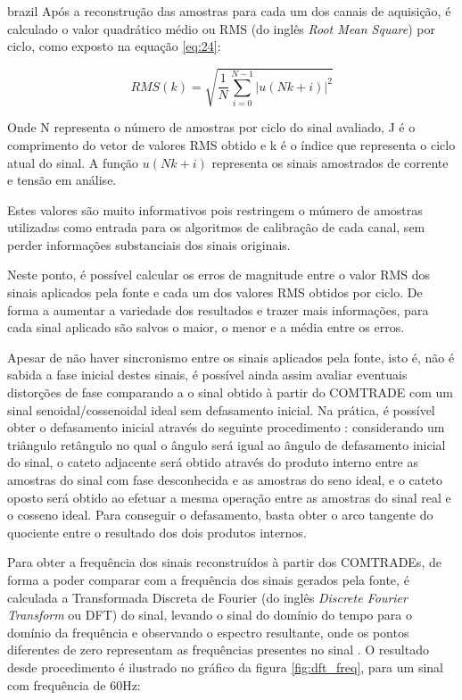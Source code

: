 \begin{otherlanguage*}{brazil}
Após a reconstrução das amostras para cada um dos canais de aquisição, é calculado o valor quadrático médio ou RMS (do inglês \textit{Root Mean Square}) por ciclo, como exposto na equação \ref{eq:24}:

\begin{equation}\label{eq:24}
RMS(k) = \sqrt{\frac{1}{N} \sum_{i=0}^{N - 1} |u(Nk + i)|^2}
\end{equation} 

Onde N representa o número de amostras por ciclo do sinal avaliado, J é o comprimento do vetor de valores  RMS obtido e k é o índice que representa o ciclo atual do sinal. A função $u(Nk + i)$ representa os sinais amostrados de corrente e tensão em análise.

Estes valores são muito informativos pois restringem o múmero de amostras utilizadas como entrada para os algoritmos de calibração de cada canal, sem perder informações substanciais dos sinais originais. 

Neste ponto, é possível calcular os erros de magnitude entre o valor RMS dos sinais aplicados pela fonte e cada um dos valores RMS obtidos por ciclo. De forma a aumentar a variedade dos resultados e trazer mais informações, para cada sinal aplicado são salvos o maior, o menor e a média entre os erros. 

Apesar de não haver sincronismo entre os sinais aplicados pela fonte, isto é, não é sabida a fase inicial destes sinais, é possível ainda assim avaliar eventuais distorções de fase comparando a o sinal obtido à partir do COMTRADE com um sinal senoidal/cossenoidal ideal sem defasamento inicial. Na prática, é possível obter o defasamento inicial através do seguinte procedimento \cite{understandingdsp}: considerando um triângulo retângulo no qual o ângulo será igual ao ângulo de defasamento inicial do sinal, o cateto adjacente será obtido através do produto interno entre as amostras do sinal com fase desconhecida e as amostras do seno ideal, e o cateto oposto será obtido ao efetuar a mesma operação entre as amostras do sinal real e o cosseno ideal. Para conseguir o defasamento, basta obter o arco tangente do quociente entre o resultado dos dois produtos internos. 

Para obter a frequência dos sinais reconstruídos à partir dos COMTRADEs, de forma a poder comparar com a frequência dos sinais gerados pela fonte, é calculada a Transformada Discreta de Fourier (do inglês \textit{Discrete Fourier Transform} ou DFT) do sinal, levando o sinal do domínio do tempo para o domínio da frequência e observando o espectro resultante, onde os pontos diferentes de zero representam as frequências presentes no sinal \cite{lathisig}. O resultado desde procedimento é ilustrado no gráfico da figura \ref{fig:dft_freq}, para um sinal com frequência de 60Hz:


\end{otherlanguage*}
